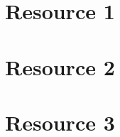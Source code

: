 \section*{Resource 1}
\lipsum[5]

\section*{Resource 2}
\lipsum[1]

\section*{Resource 3}
\lipsum[1]
